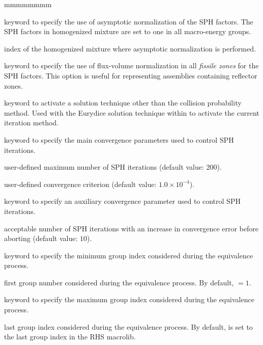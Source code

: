\begin{ListeDeDescription}{mmmmmmmm}
\item[\moc{ASYM}] keyword to specify the use of asymptotic normalization of the
SPH factors. The SPH factors in homogenized mixture  are set to one
in all macro-energy groups.

\item[\dusa{mixs}] index of the homogenized mixture where asymptotic normalization
is performed.

\item[\moc{STD\_FISS}] keyword to specify the use of flux-volume normalization in all {\sl fissile zones} for the SPH factors. This option is useful for representing assemblies
containing reflector zones.

\item[\moc{ARM}] keyword to activate a solution technique other than the collision probability method. Used with the Eurydice
solution technique within  to activate the current iteration method.

\item[\moc{ITER}] keyword to specify the main convergence parameters used to control SPH iterations.

\item[\dusa{maxout}] user-defined maximum number of SPH iterations (default value: $200$).

\item[\dusa{epsout}] user-defined convergence criterion (default value: $1.0 \times 10^{-4}$).

\item[\moc{MAXNB}] keyword to specify an auxiliary convergence parameter used to control SPH iterations.

\item[\dusa{maxnb}] acceptable number of SPH iterations with an increase in convergence error before
aborting (default value: $10$).

\item[\moc{GRMIN}] keyword to specify the minimum group index considered
during the equivalence process.

\item[\dusa{lgrmin}] first group number considered during the
equivalence process. By default,  $=1$.

\item[\moc{GRMAX}]  keyword to specify the maximum group index considered
during the equivalence process.

\item[\dusa{lgrmax}] last group index considered during the equivalence
process. By default,  is set to the last group
index in the RHS macrolib.


\end{ListeDeDescription}
